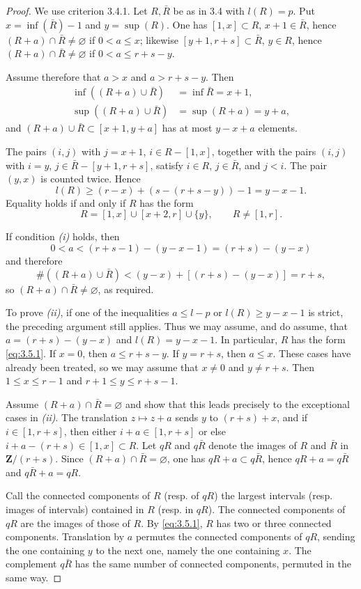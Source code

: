 \documentclass[11pt]{amsart}
\theoremstyle{definition}
\begin{document}
\begin{proof}
We use criterion 3.4.1. Let $R,\bar R$ be as in 3.4 with $l(R)=p$. Put $x=\inf(\bar R)-1$ and $y=\sup(R)$. One has $[1,x]\subset R$, $x+1\in \bar R$, hence $(R+a)\cap\bar R\neq\varnothing$ if $0<a\le x$; likewise $[y+1,r+s]\subset \bar R$, $y\in R$, hence $(R+a)\cap\bar R\neq\varnothing$ if $0<a\le r+s-y$.

Assume therefore that $a>x$ and $a>r+s-y$. Then
\begin{align*}
\inf((R+a)\cup \bar R) &= \inf \bar R = x+1,\\
\sup((R+a)\cup \bar R) &= \sup(R+a) = y+a,
\end{align*}
and $(R+a)\cup\bar R\subset [x+1,y+a]$ has at most $y-x+a$ elements.

The pairs $(i,j)$ with $j=x+1$, $i\in R-[1,x]$, together with the pairs $(i,j)$ with $i=y$, $j\in \bar R-[y+1,r+s]$, satisfy $i\in R$, $j\in\bar R$, and $j<i$. The pair $(y,x)$ is counted twice. Hence
\[
l(R)\ge (r-x)+(s-(r+s-y))-1 = y-x-1.
\]
Equality holds if and only if $R$ has the form
\begin{equation}\label{eq:3.5.1}
R=[1,x]\cup [x+2,r]\cup\{y\},\qquad R\neq [1,r].
\tag{3.5.1}
\end{equation}

If condition \emph{(i)} holds, then
\[
0<a<(r+s-1)-(y-x-1)=(r+s)-(y-x)
\]
and therefore
\[
\#((R+a)\cup \bar R) < (y-x)+[(r+s)-(y-x)] = r+s,
\]
so $(R+a)\cap\bar R\neq\varnothing$, as required.

To prove \emph{(ii)}, if one of the inequalities $a\le l-p$ or $l(R)\ge y-x-1$ is strict, the preceding argument still applies. Thus we may assume, and do assume, that $a=(r+s)-(y-x)$ and $l(R)=y-x-1$. In particular, $R$ has the form \eqref{eq:3.5.1}. If $x=0$, then $a\le r+s-y$. If $y=r+s$, then $a\le x$. These cases have already been treated, so we may assume that $x\neq 0$ and $y\neq r+s$. Then $1\le x\le r-1$ and $r+1\le y\le r+s-1$.

Assume $(R+a)\cap\bar R=\varnothing$ and show that this leads precisely to the exceptional cases in \emph{(ii)}. The translation $z\mapsto z+a$ sends $y$ to $(r+s)+x$, and if $i\in [1,r+s]$, then either $i+a\in [1,r+s]$ or else $i+a-(r+s)\in [1,x]\subset R$. Let $qR$ and $q\bar R$ denote the images of $R$ and $\bar R$ in $\mathbf Z/(r+s)$. Since $(R+a)\cap\bar R=\varnothing$, one has $qR+a\subset q\bar R$, hence $qR+a=q\bar R$ and $q\bar R+a=qR$.

Call the connected components of $R$ (resp. of $qR$) the largest intervals (resp. images of intervals) contained in $R$ (resp. in $qR$). The connected components of $qR$ are the images of those of $R$. By \eqref{eq:3.5.1}, $R$ has two or three connected components. Translation by $a$ permutes the connected components of $qR$, sending the one containing $y$ to the next one, namely the one containing $x$. The complement $q\bar R$ has the same number of connected components, permuted in the same way.


\end{proof}
\end{document}
